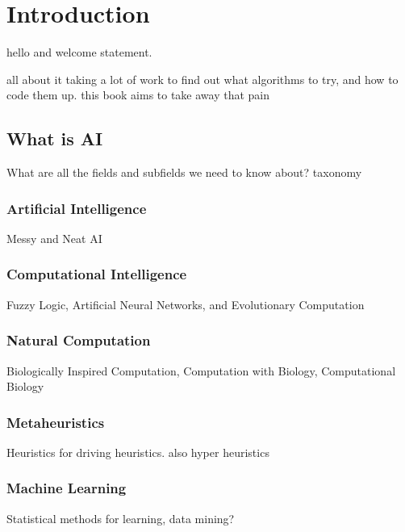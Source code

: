 


\chapter{Introduction}
\label{chap:intro}

hello and welcome statement.

all about it taking a lot of work to find out what algorithms to try, and how to code them up. this book aims to take away that pain


% 
% 
\section{What is AI}
\label{intro:sec:what_is_ai}
What are all the fields and subfields we need to know about? 
taxonomy

\subsection{Artificial Intelligence}
Messy and Neat AI

\subsection{Computational Intelligence}
Fuzzy Logic, Artificial Neural Networks, and Evolutionary Computation

\subsection{Natural Computation}
Biologically Inspired Computation, Computation with Biology, Computational Biology

\subsection{Metaheuristics}
Heuristics for driving heuristics. also hyper heuristics

\subsection{Machine Learning}
Statistical methods for learning, data mining?

